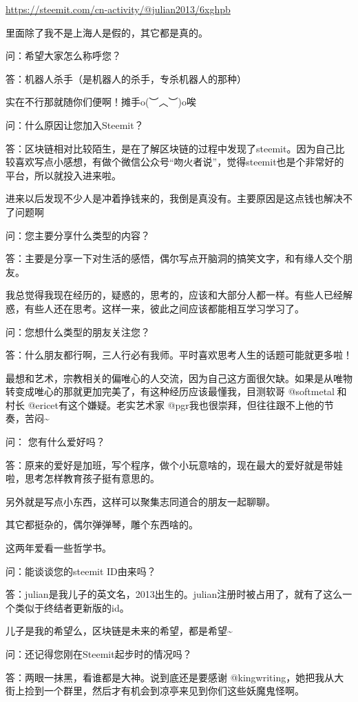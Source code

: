 \documentclass[]{ctexbook}
\begin{document}
\url{https://steemit.com/cn-activity/@julian2013/6xghpb}

里面除了我不是上海人是假的，其它都是真的。

问：希望大家怎么称呼您？

答：机器人杀手（是机器人的杀手，专杀机器人的那种）

实在不行那就随你们便啊！摊手o(︶︿︶)o唉

问：什么原因让您加入Steemit？

答：区块链相对比较陌生，是在了解区块链的过程中发现了steemit。因为自己比较喜欢写点小感想，有做个微信公众号``吻火者说''，觉得steemit也是个非常好的平台，所以就投入进来啦。

进来以后发现不少人是冲着挣钱来的，我倒是真没有。主要原因是这点钱也解决不了问题啊

问：您主要分享什么类型的内容？

答：主要是分享一下对生活的感悟，偶尔写点开脑洞的搞笑文字，和有缘人交个朋友。

我总觉得我现在经历的，疑惑的，思考的，应该和大部分人都一样。有些人已经解惑，有些人还在思考。这样一来，彼此之间应该都能相互学习学习了。

问：您想什么类型的朋友关注您？

答：什么朋友都行啊，三人行必有我师。平时喜欢思考人生的话题可能就更多啦！

最想和艺术，宗教相关的偏唯心的人交流，因为自己这方面很欠缺。如果是从唯物转变成唯心的那就更加完美了，有这种经历应该最懂我，目测软哥 @softmetal 和村长 @ericet有这个嫌疑。老实艺术家 @pgr我也很崇拜，但往往跟不上他的节奏，苦闷\textasciitilde{}

问： 您有什么爱好吗？

答：原来的爱好是加班，写个程序，做个小玩意啥的，现在最大的爱好就是带娃啦，思考怎样教育孩子挺有意思的。

另外就是写点小东西，这样可以聚集志同道合的朋友一起聊聊。

其它都挺杂的，偶尔弹弹琴，雕个东西啥的。

这两年爱看一些哲学书。

问：能谈谈您的steemit ID由来吗？

答：julian是我儿子的英文名，2013出生的。julian注册时被占用了，就有了这么一个类似于终结者更新版的id。

儿子是我的希望么，区块链是未来的希望，都是希望\textasciitilde{}

问：还记得您刚在Steemit起步时的情况吗？

答：两眼一抹黑，看谁都是大神。说到底还是要感谢 @kingwriting，她把我从大街上捡到一个群里，然后才有机会到凉亭来见到你们这些妖魔鬼怪啊。
\end{document}

